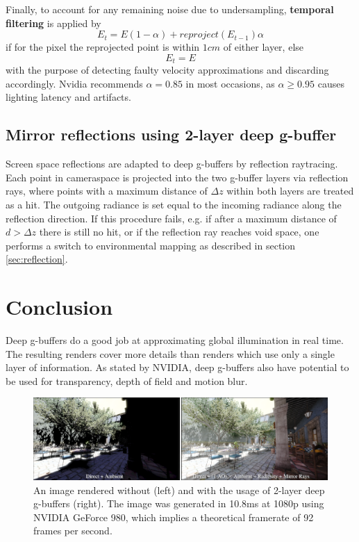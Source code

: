 \documentclass{ACGSeminar}
\begin{document}
		Finally, to account for any remaining noise due to undersampling, \textbf{temporal filtering} is applied by
		$$ E_t = E(1 - \alpha) + reproject(E_{t-1}) \alpha $$
		if for the pixel the reprojected point is within $1cm$ of either layer, else
		$$ E_t = E $$
		with the purpose of detecting faulty velocity approximations and discarding accordingly. Nvidia recommends $\alpha = 0.85$ in most occasions, as $\alpha \geq 0.95$ causes lighting latency and artifacts.

	\subsection{Mirror reflections using 2-layer deep g-buffer}
		Screen space reflections are adapted to deep g-buffers by reflection raytracing. Each point in cameraspace is projected into the two g-buffer layers via reflection rays, where points with a maximum distance of $\Delta z$ within both layers are treated as a hit. The outgoing radiance is set equal to the incoming radiance along the reflection direction. If this procedure fails, e.g. if after a maximum distance of $d > \Delta z$ there is still no hit, or if the reflection ray reaches void space, one performs a switch to environmental mapping as described in section \ref{sec:reflection}.

\section{Conclusion}
	Deep g-buffers do a good job at approximating global illumination in real time. The resulting renders cover more details than renders which use only a single layer of information. As stated by NVIDIA, deep g-buffers also have potential to be used for transparency, depth of field and motion blur.%

	\begin{figure}[htb!]%
		\begin{center}%
			\includegraphics[width=16cm]{img/deep_g_buffer_render.png}
		\end{center}%
		\caption{An image rendered without (left) and with the usage of 2-layer deep g-buffers (right). The image was generated in 10.8ms at 1080p using NVIDIA GeForce 980, which implies a theoretical framerate of 92 frames per second.}%
		\label{fig:deep_g_buffer_render}%
	\end{figure}%

\printbibliography
\end{document}
